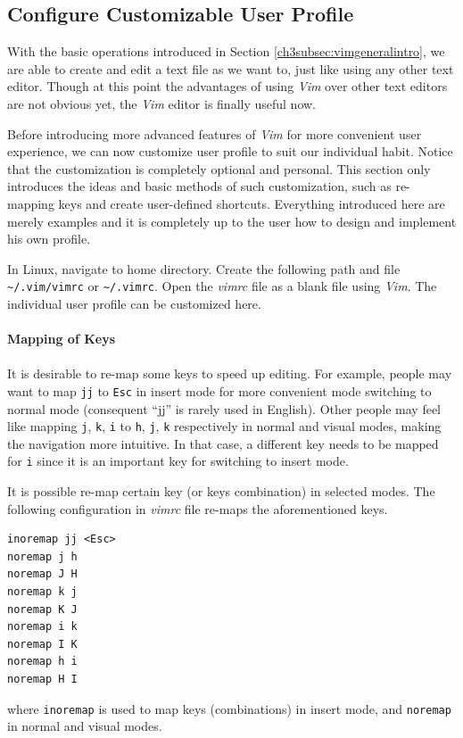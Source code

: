 \subsection{Configure Customizable User Profile}

With the basic operations introduced in Section \ref{ch3subsec:vimgeneralintro}, we are able to create and edit a text file as we want to, just like using any other text editor. Though at this point the advantages of using \textit{Vim} over other text editors are not obvious yet, the \textit{Vim} editor is finally useful now.

Before introducing more advanced features of \textit{Vim} for more convenient user experience, we can now customize user profile to suit our individual habit. Notice that the customization is completely optional and personal. This section only introduces the ideas and basic methods of such customization, such as re-mapping keys and create user-defined shortcuts. Everything introduced here are merely examples and it is completely up to the user how to design and implement his own profile.

In Linux, navigate to home directory. Create the following path and file \verb|~/.vim/vimrc| or \verb|~/.vimrc|. Open the \textit{vimrc} file as a blank file using \textit{Vim}. The individual user profile can be customized here.
\\
\\
\noindent \textbf{Mapping of Keys}
\\
\\
It is desirable to re-map some keys to speed up editing. For example, people may want to map \verb|jj| to \verb|Esc| in insert mode for more convenient mode switching to normal mode (consequent ``jj'' is rarely used in English). Other people may feel like mapping \verb|j|, \verb|k|, \verb|i| to \verb|h|, \verb|j|, \verb|k| respectively in normal and visual modes, making the navigation more intuitive. In that case, a different key needs to be mapped for \verb|i| since it is an important key for switching to insert mode.

It is possible re-map certain key (or keys combination) in selected modes. The following configuration in \textit{vimrc} file re-maps the aforementioned keys.
\begin{verbatim}
inoremap jj <Esc>
noremap j h
noremap J H
noremap k j
noremap K J
noremap i k
noremap I K
noremap h i
noremap H I
\end{verbatim}
where \verb|inoremap| is used to map keys (combinations) in insert mode, and \verb|noremap| in normal and visual modes.

